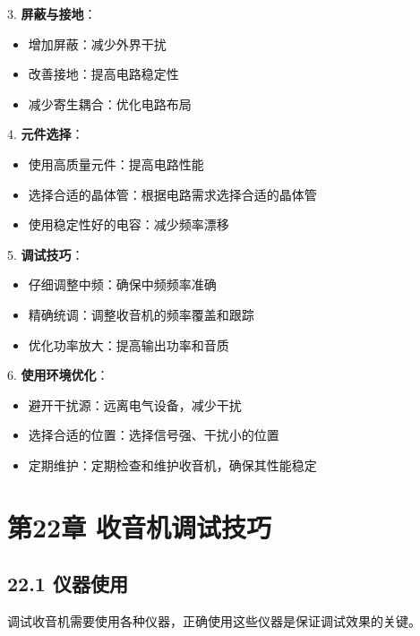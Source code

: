 \documentclass[12pt,UTF8]{ctexbook}
\begin{document}
3. \textbf{屏蔽与接地}：
   \begin{itemize}[leftmargin=3.5em]
   \item 增加屏蔽：减少外界干扰
   \item 改善接地：提高电路稳定性
   \item 减少寄生耦合：优化电路布局
   \end{itemize}

4. \textbf{元件选择}：
   \begin{itemize}[leftmargin=3.5em]
   \item 使用高质量元件：提高电路性能
   \item 选择合适的晶体管：根据电路需求选择合适的晶体管
   \item 使用稳定性好的电容：减少频率漂移
   \end{itemize}

5. \textbf{调试技巧}：
   \begin{itemize}[leftmargin=3.5em]
   \item 仔细调整中频：确保中频频率准确
   \item 精确统调：调整收音机的频率覆盖和跟踪
   \item 优化功率放大：提高输出功率和音质
   \end{itemize}

6. \textbf{使用环境优化}：
   \begin{itemize}[leftmargin=3.5em]
   \item 避开干扰源：远离电气设备，减少干扰
   \item 选择合适的位置：选择信号强、干扰小的位置
   \item 定期维护：定期检查和维护收音机，确保其性能稳定
   \end{itemize}

\chapter*{第22章 收音机调试技巧}
\section*{22.1 仪器使用}

调试收音机需要使用各种仪器，正确使用这些仪器是保证调试效果的关键。
\end{document}

